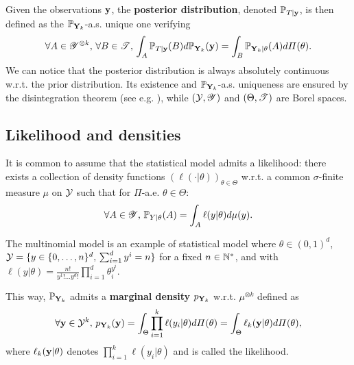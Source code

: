 Given the observations $\mathbf{y}$, the \textbf{posterior distribution}, denoted $\mathbb{P}_{T|\mathbf{y}}$, is then defined as the $\mathbb{P}_{\mathbf{Y}_k}$-a.s. unique one verifying
    \begin{equation}
        \forall A\in\mathscr{Y}^{\otimes k},\,\forall B\in\mathscr{T},\, \int_{A}\mathbb{P}_{T|\mathbf{y}}(B)d\mathbb{P}_{\mathbf{Y}_k}(\mathbf{y}) = \int_B \mathbb{P}_{\mathbf{Y}_k|\theta}(A)d\varPi(\theta).
    \end{equation}
We can notice that the posterior distribution is always absolutely continuous w.r.t. the prior distribution.
Its existence and $\mathbb{P}_{\mathbf{Y}_k}$-a.s. uniqueness are ensured by the disintegration theorem (see e.g. \cite{chang_conditioning_1997}), while $(\mathcal{Y},\mathscr{Y})$ and $(\Theta,\mathscr{T})$ are Borel spaces.



\subsection{Likelihood and densities}\label{sec:intro-ref:likelihoods}


It is common to assume that the statistical model admits a likelihood: there exists a collection of density functions $(\ell(\cdot|\theta))_{\theta\in\Theta}$  w.r.t. a common  $\sigma$-finite measure $\mu$ on $\mathcal{Y}$ such that for $\varPi$-a.e. $\theta\in\Theta$:
    \begin{equation}
        \forall A\in\mathscr{Y},\,\mathbb{P}_{Y|\theta}(A) = \int_A\ell(y|\theta)d\mu(y).
    \end{equation}

\color{orange}
\begin{ex}\label{ex:intro-ref:multinomialmodel}
    The multinomial model is an example of statistical model where $\theta\in(0,1)^d$, $\mathcal{Y}=\{y\in\{0,\dots,n\}^d,\,\sum_{i=1}^dy^i=n\} $ for a fixed $n\in\mathbb{N}^\ast$, and with
        $%
            \ell(y|\theta) = \frac{n!}{y^1!\dots y^d!}\prod_{i=1}^d\theta_i^{y^i}.
        $%
\end{ex}
\color{black}

This way, $\mathbb{P}_{\mathbf{Y}_k}$ admits a \textbf{marginal density} $p_{\mathbf{Y}_k}$ w.r.t. $\mu^{\otimes k}$ defined as
    \begin{equation}
        \forall\mathbf{y}\in\mathcal{Y}^k,\, p_{\mathbf{Y}_k}(\mathbf{y}) = \int_\Theta\prod_{i=1}^k\ell(y_i|\theta) d\varPi(\theta) = \int_\Theta \ell_k(\mathbf{y}|\theta)d\varPi(\theta),
    \end{equation}
where $\ell_k(\mathbf{y}|\theta)$ denotes $\prod_{i=1}^k\ell(y_i|\theta)$ and is called the likelihood.


